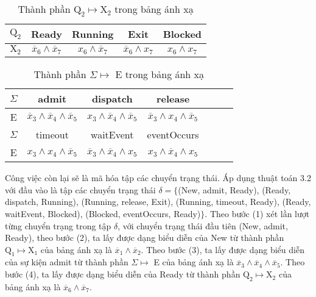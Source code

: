 \documentclass[a4paper,13pt,oneside,openany]{book}
\begin{document}
\begin{flushleft}
	\begin{table}[!ht]
		\centering
		\renewcommand{\arraystretch}{1.25}
		\begin{tabular}{|c|c|c|c|c|}
			\hline
			$\textrm{Q}_2$ & Ready & Running & Exit & Blocked\\
			\hline
			$\textrm{X}_2$ & $\overline{x}_6 \land \overline{x}_7$ & $x_6\land \overline{x}_7$ & $\overline{x}_6\land x_7$ &
			$x_6 \land x_7$\\
			\hline
		\end{tabular}
		\caption{Thành phần $\textrm{Q}_2 \mapsto \textrm{X}_2$ trong bảng ánh xạ}
	\end{table}
	
	\begin{table}[!ht]
		\centering
		\renewcommand{\arraystretch}{1.25}
		\begin{tabular}{|c|c|c|c|c|c|c|}
			\hline
			$\Sigma$ & admit & dispatch & release\\
			\hline
			E & $\overline{x}_3 \land \overline{x}_4 \land \overline{x}_5$ & $x_3 \land \overline{x}_4 \land \overline{x}_5$ & $\overline{x}_3 \land x_4 \land \overline{x}_5$\\
			\hline
			$\Sigma$ & timeout & waitEvent & eventOccurs\\
			\hline
			E &  $x_3 \land x_4 \land \overline{x}_5$ & $\overline{x}_3 \land \overline{x}_4 \land x_5$ & $x_3 \land \overline{x}_4 \land x_5$\\
			\hline
		\end{tabular}
		\caption{Thành phần $\Sigma \mapsto$ E trong bảng ánh xạ}
	\end{table}
	\noindent
	Công việc còn lại sẽ là mã hóa tập các chuyển trạng thái. Áp dụng thuật toán 3.2 với đầu vào là tập các chuyển trạng thái $\delta = \{$(New, admit, Ready), (Ready, dispatch, Running), (Running, release, Exit), (Running, timeout, Ready), (Ready, waitEvent, Blocked), (Blocked, eventOccurs, Ready)$\}$. Theo bước (1) xét lần lượt từng chuyển trạng trong tập $\delta$, với chuyển trạng thái đầu tiên (New, admit, Ready), theo bước (2), ta lấy được dạng biểu diễn của New từ thành phần $\textrm{Q}_1 \mapsto \textrm{X}_1$ của bảng ánh xạ là $\overline{x}_1 \land \overline{x}_2$. Theo bước (3), ta lấy được dạng biểu diễn của sự kiện admit từ thành phần $\Sigma \mapsto$ E của bảng ánh xạ là $\overline{x}_3 \land \overline{x}_4 \land \overline{x}_5$. Theo bước (4), ta lấy được dạng biểu diễn của Ready từ thành phần $\textrm{Q}_2 \mapsto \textrm{X}_2$ của bảng ánh xạ là $\overline{x}_6 \land \overline{x}_7$.

\end{flushleft}
\end{document}

